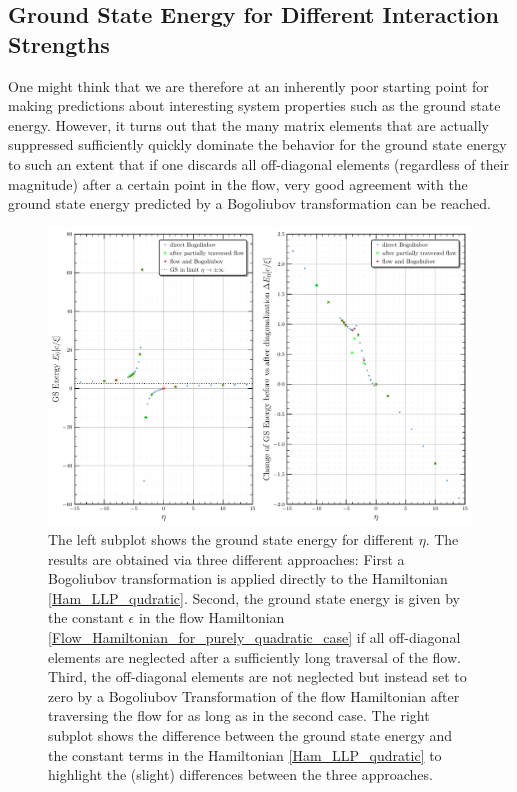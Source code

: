 \subsection{Ground State Energy for Different Interaction Strengths}
One might think that we are therefore at an inherently poor starting point for making predictions about interesting system properties such as the ground state energy. However, it turns out that the many matrix elements that are actually suppressed sufficiently quickly dominate the behavior for the ground state energy to such an extent that if one discards all off-diagonal elements (regardless of their magnitude) after a certain point in the flow, very good agreement with the ground state energy predicted by a Bogoliubov transformation can be reached.
\begin{figure}[H]
    \centering
    \includegraphics[width=\textwidth]{figures/plots/PDF/GS_energies_bog_flow_comp.pdf}
    \caption[Ground state energy of Bose Polaron for different $\eta$]{The left subplot shows the ground state energy for different $\eta$. The results are obtained via three different approaches: First a Bogoliubov transformation is applied directly to the Hamiltonian \ref{Ham_LLP_qudratic}. Second, the ground state energy is given by the constant $\epsilon$ in the flow Hamiltonian \ref{Flow_Hamiltonian_for_purely_quadratic_case} if all off-diagonal elements are neglected after a sufficiently long traversal of the flow. Third, the off-diagonal elements are not neglected but instead set to zero by a Bogoliubov Transformation of the flow Hamiltonian after traversing the flow for as long as in the second case.
The right subplot shows the difference between the ground state energy and the constant terms in the Hamiltonian \ref{Ham_LLP_qudratic} to highlight the (slight) differences between the three approaches.\\
}
    \label{GSenergiesBogFlow}
\end{figure}
